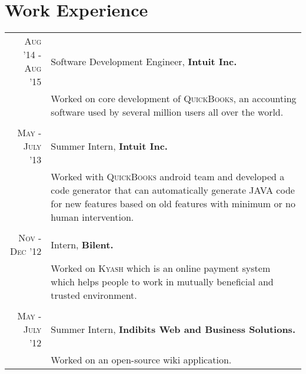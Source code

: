 \documentclass[a4paper,10pt]{article} %
\begin{document}

\section{Work Experience}
\renewcommand{\arraystretch}{0.75}%
\begin{tabular}{r|p{11cm}}
\textsc{Aug '14 - Aug '15} & Software Development Engineer, \textbf{Intuit Inc.} \\
& \footnotesize{Worked on core development of \textsc{QuickBooks}, an accounting software used by several million users all over the world.}\\
\multicolumn{2}{c}{} \\

\textsc{May - July '13} & Summer Intern, \textbf{Intuit Inc.}\\ 
& \footnotesize{Worked with \textsc{QuickBooks} android  team and developed a code generator that can automatically generate JAVA code for new features based on old features with minimum or no human intervention.}\\
\multicolumn{2}{c}{} \\


\textsc{Nov - Dec '12} & Intern, \textbf{Bilent.}\\
& \footnotesize{Worked on \textsc{Kyash} which is an online payment system which helps people to
work in mutually beneficial and trusted environment.}\\
\multicolumn{2}{c}{} \\


\textsc{May - July '12} & Summer Intern, \textbf{Indibits Web and Business Solutions.}\\
& \footnotesize{Worked on an open-source wiki application.}
\end{tabular}
\end{document}

